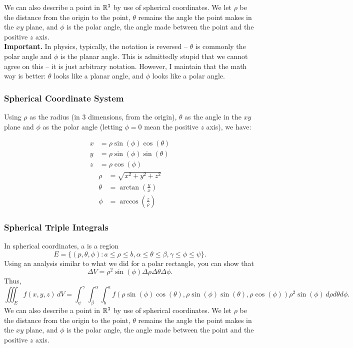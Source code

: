 We can also describe a point in \(\mathbb{R}^3\) by use of spherical coordinates. We let \(\rho\) be the distance from the origin to the point, \(\theta\) remains the angle the point makes in the \(xy\) plane, and \(\phi\) is the polar angle, the angle made between the point and the positive \(z\) axis. \\

\textbf{Important.} In physics, typically, the notation is reversed – \(\theta\) is commonly the polar angle and \(\phi\) is the planar angle. This is admittedly stupid that we cannot agree on this – it is just arbitrary notation. However, I maintain that the math way is better: \(\theta\) looks like a planar angle, and \(\phi\) looks like a polar angle.

\subsubsection{Spherical Coordinate System}

Using \(\rho\) as the radius (in 3 dimensions, from the origin), \(\theta\) as the angle in the \(xy\) plane and \(\phi\) as the polar angle (letting \(\phi = 0\) mean the positive \(z\) axis), we have:

\begin{multicols}{2}
  \noindent
  \begin{align*}
    x & = \rho \sin(\phi) \cos(\theta) \\
    y & = \rho \sin(\phi) \sin(\theta) \\
    z & = \rho \cos(\phi)
  \end{align*}
  \begin{align*}
    \rho & = \sqrt{x^2 + y^2 + z^2} \\
    \theta & = \arctan(\tfrac{y}{x}) \\
    \phi & = \arccos(\tfrac{z}{\rho})
  \end{align*}
\end{multicols}

\subsubsection{Spherical Triple Integrals}

In spherical coordinates, a  is a region
\[
  E = \{(p, \theta, \phi) : a \leq \rho \leq b, \alpha \leq \theta \leq \beta, \gamma \leq \phi \leq \psi\}.
\]
Using an analysis similar to what we did for a polar rectangle, you can show that
\[
  \Delta V = \rho^2 \sin(\phi) \Delta \rho \Delta \theta \Delta \phi.
\]
Thus,
\[
  \iiint_E f(x, y, z) \, dV = \int_{\psi}^{\gamma} \int_{\beta}^{\alpha} \int_{b}^{a} f(\rho \sin(\phi) \cos(\theta), \rho \sin(\phi) \sin(\theta), \rho \cos(\phi)) \rho^2 \sin(\phi) \, d\rho d\theta d\phi.
\]
We can also describe a point in \(\mathbb{R}^3\) by use of spherical coordinates. We let \(\rho\) be the distance from the origin to the point, \(\theta\) remains the angle the point makes in the \(xy\) plane, and \(\phi\) is the polar angle, the angle made between the point and the positive \(z\) axis.

